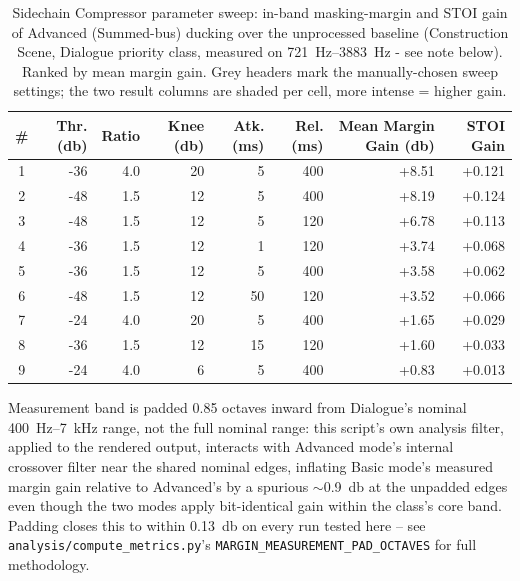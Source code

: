 
\begin{table}[h]
\centering
\footnotesize
\caption{Sidechain Compressor parameter sweep: in-band masking-margin and STOI
gain of Advanced (Summed-bus) ducking over the unprocessed baseline
(Construction Scene, Dialogue priority class, measured on
\SI{721}{\hertz}--\SI{3883}{\hertz} - see note below). Ranked by mean
margin gain. Grey headers mark the manually-chosen sweep settings; the two
result columns are shaded per cell, more intense = higher gain.}
\label{tab:param-sweep}
\begin{tabular}{@{}c r r r r r r r@{}}
\toprule
\cellcolor{paramgrey}\textbf{\#} & \cellcolor{paramgrey}\textbf{Thr.} (\si{\decibel}) & \cellcolor{paramgrey}\textbf{Ratio} & \cellcolor{paramgrey}\textbf{Knee} (\si{\decibel}) & \cellcolor{paramgrey}\textbf{Atk.} (\si{\milli\second}) & \cellcolor{paramgrey}\textbf{Rel.} (\si{\milli\second}) & \textbf{Mean Margin Gain} (\si{\decibel}) & \textbf{STOI Gain} \\
\midrule
1 & -36 & 4.0 & 20 & 5  & 400 & \cellcolor{green!70}+8.51 & \cellcolor{yellow!68}+0.121 \\
2 & -48 & 1.5 & 12 & 5  & 400 & \cellcolor{green!68}+8.19 & \cellcolor{yellow!70}+0.124 \\
3 & -48 & 1.5 & 12 & 5  & 120 & \cellcolor{green!58}+6.78 & \cellcolor{yellow!64}+0.113 \\
4 & -36 & 1.5 & 12 & 1  & 120 & \cellcolor{green!36}+3.74 & \cellcolor{yellow!42}+0.068 \\
5 & -36 & 1.5 & 12 & 5  & 400 & \cellcolor{green!35}+3.58 & \cellcolor{yellow!39}+0.062 \\
6 & -48 & 1.5 & 12 & 50 & 120 & \cellcolor{green!34}+3.52 & \cellcolor{yellow!41}+0.066 \\
7 & -24 & 4.0 & 20 & 5  & 400 & \cellcolor{green!21}+1.65 & \cellcolor{yellow!23}+0.029 \\
8 & -36 & 1.5 & 12 & 15 & 120 & \cellcolor{green!21}+1.60 & \cellcolor{yellow!25}+0.033 \\
9 & -24 & 4.0 & 6  & 5  & 400 & \cellcolor{green!15}+0.83 & \cellcolor{yellow!15}+0.013 \\
\bottomrule
\end{tabular}
\par\vspace{4pt}
\raggedright\footnotesize Measurement band is padded 0.85 octaves inward
from Dialogue's nominal \SI{400}{\hertz}--\SI{7}{\kilo\hertz} range, not
the full nominal range: this script's own analysis filter, applied to the
rendered output, interacts with Advanced mode's internal crossover filter
near the shared nominal edges, inflating Basic mode's measured margin gain
relative to Advanced's by a spurious $\sim$\SI{0.9}{\decibel} at the
unpadded edges even though the two modes apply bit-identical gain within
the class's core band. Padding closes this to within
\SI{0.13}{\decibel} on every run tested here -- see
\texttt{analysis/compute\_metrics.py}'s \texttt{MARGIN\_MEASUREMENT\_PAD\_OCTAVES}
for full methodology.
\end{table}
